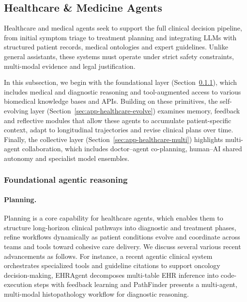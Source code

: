 \subsection{Healthcare \& Medicine Agents}
\label{sec:app-healthcare}



Healthcare and medical agents seek to support the full clinical decision pipeline, from initial symptom triage to treatment planning and integrating LLMs with structured patient records, medical ontologies and expert guidelines. Unlike general assistants, these systems must operate under strict safety constraints, multi-modal evidence and legal justification.

In this subsection, we begin with the foundational layer (Section~\ref{sec:app-healthcare-foundational}), which includes medical and diagnostic reasoning and tool-augmented access to various biomedical knowledge bases and APIs. Building on these primitives, the self-evolving layer (Section~\ref{sec:app-healthcare-evolve}) examines memory, feedback and reflective modules that allow these agents to accumulate patient-specific context, adapt to longitudinal trajectories and revise clinical plans over time. Finally, the collective layer (Section~\ref{sec:app-healthcare-multi}) highlights multi-agent collaboration, which includes doctor–agent co-planning, human–AI shared autonomy and specialist model ensembles.



\subsubsection{Foundational agentic reasoning}
\label{sec:app-healthcare-foundational}



\paragraph{Planning.}


Planning is a core capability for healthcare agents, which enables them to structure long-horizon clinical pathways into diagnostic and treatment phases, refine workflows dynamically as patient conditions evolve and coordinate across teams and tools toward cohesive care delivery. We discuss several various recent advancements as follows. For instance, a recent agentic clinical system~\cite{ferber2024autonomousartificialintelligenceagents} orchestrates specialized tools and guideline citations to support oncology decision-making, EHRAgent \cite{wenqi2024ehragent} decomposes multi-table EHR inference into code-execution steps with feedback learning and PathFinder \cite{ghezloo2025pathfinder} presents a multi-agent, multi-modal histopathology workflow for diagnostic reasoning.  

